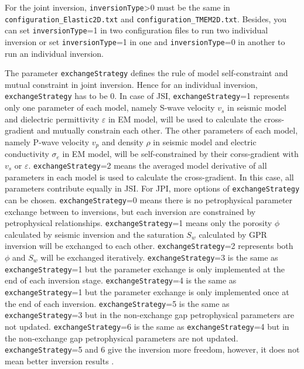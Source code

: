 \documentclass[pdftex,a4paper,parskip,listof=totoc,bibliography=totoc,onehalfspacing,12pt]{scrreprt}
\newcommand{\shellcmd}[1]{\indent\indent\texttt{#1}}	%
\begin{document}
For the joint inversion, \verb+inversionType+>0 must be the same in \shellcmd{configuration\_Elastic2D.txt} and \shellcmd{configuration\_TMEM2D.txt}. Besides, you can set \verb+inversionType+=1 in two configuration files to run two individual inversion or set \verb+inversionType+=1 in one and \verb+inversionType+=0 in another to run an individual inversion.

The parameter \verb+exchangeStrategy+ defines the rule of model self-constraint and mutual constraint in joint inversion. Hence for an individual inversion, \verb+exchangeStrategy+ has to be 0. In case of JSI, \verb+exchangeStrategy+=1 represents only one parameter of each model, namely S-wave velocity $v_s$ in seismic model and dielectric permittivity $\varepsilon$ in EM model, will be used to calculate the cross-gradient and mutually constrain each other. The other parameters of each model, namely P-wave velocity $v_p$ and density $\rho$ in seismic model and electric conductivity $\sigma_e$ in EM model, will be self-constrained by their corss-gradient with $v_s$ or $\varepsilon$. \verb+exchangeStrategy+=2 means the averaged model derivative of all parameters in each model is used to calculate the cross-gradient. In this case, all parameters contribute equally in JSI. For JPI, more options of \verb+exchangeStrategy+ can be chosen. \verb+exchangeStrategy+=0 means there is no petrophysical parameter exchange between to inversions, but each inversion are constrained by petrophysical relationships. \verb+exchangeStrategy+=1 means only the porosity $\phi$ calculated by seismic inversion and the saturation $S_w$ calculated by GPR inversion will be exchanged to each other. \verb+exchangeStrategy+=2 represents both $\phi$ and $S_w$ will be exchanged iteratively. \verb+exchangeStrategy+=3 is the same as \verb+exchangeStrategy+=1 but the parameter exchange is only implemented at the end of each inversion stage. \verb+exchangeStrategy+=4 is the same as \verb+exchangeStrategy+=1 but the parameter exchange is only implemented once at the end of each inversion. \verb+exchangeStrategy+=5 is the same as \verb+exchangeStrategy+=3 but in the non-exchange gap petrophysical parameters are not updated. \verb+exchangeStrategy+=6 is the same as \verb+exchangeStrategy+=4 but in the non-exchange gap petrophysical parameters are not updated. \verb+exchangeStrategy+=5 and 6 give the inversion more freedom, however, it does not mean better inversion results \cite{qin2021joint}.
\end{document}
